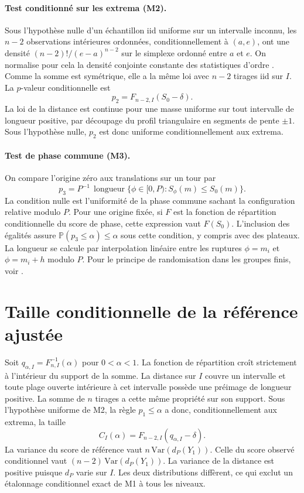\documentclass[11pt,a4paper]{article}
\newcommand{\Prb}{\mathbb P}
\begin{document}
\paragraph{Test conditionné sur les extrema (M2).}
Sous l'hypothèse nulle d'un échantillon iid uniforme sur un intervalle inconnu, les $n-2$ observations intérieures ordonnées, conditionnellement à $(a,e)$, ont une densité $(n-2)!/(e-a)^{n-2}$ sur le simplexe ordonné entre $a$ et $e$. On normalise pour cela la densité conjointe constante des statistiques d'ordre \cite{order}. Comme la somme est symétrique, elle a la même loi avec $n-2$ tirages iid sur $I$. La $p$-valeur conditionnelle est
\begin{equation}\label{eq:m2}
p_2=F_{n-2,I}(S_0-\delta).
\end{equation}
La loi de la distance est continue pour une masse uniforme sur tout intervalle de longueur positive, par découpage du profil triangulaire en segments de pente $\pm1$. Sous l'hypothèse nulle, $p_2$ est donc uniforme conditionnellement aux extrema.

\paragraph{Test de phase commune (M3).}
On compare l'origine zéro aux translations sur un tour par
\begin{equation}\label{eq:m3}
p_3=P^{-1}\,\operatorname{longueur}\{\phi\in[0,P):S_\phi(m)\leq S_0(m)\}.
\end{equation}
La condition nulle est l'uniformité de la phase commune sachant la configuration relative modulo $P$. Pour une origine fixée, si $F$ est la fonction de répartition conditionnelle du score de phase, cette expression vaut $F(S_0)$. L'inclusion des égalités assure $\Prb(p_3\leq\alpha)\leq\alpha$ sous cette condition, y compris avec des plateaux. La longueur se calcule par interpolation linéaire entre les ruptures $\phi=m_i$ et $\phi=m_i+h$ modulo $P$. Pour le principe de randomisation dans les groupes finis, voir \cite{hemerik}.

\section{Taille conditionnelle de la référence ajustée}

Soit $q_{\alpha,I}=F_{n,I}^{-1}(\alpha)$ pour $0<\alpha<1$. La fonction de répartition croît strictement à l'intérieur du support de la somme. La distance sur $I$ couvre un intervalle et toute plage ouverte intérieure à cet intervalle possède une préimage de longueur positive. La somme de $n$ tirages a cette même propriété sur son support. Sous l'hypothèse uniforme de M2, la règle $p_1\leq\alpha$ a donc, conditionnellement aux extrema, la taille
\begin{equation}\label{eq:cond}
C_I(\alpha)=F_{n-2,I}(q_{\alpha,I}-\delta).
\end{equation}
La variance du score de référence vaut $n\,\mathrm{Var}(d_P(Y_1))$. Celle du score observé conditionnel vaut $(n-2)\,\mathrm{Var}(d_P(Y_1))$. La variance de la distance est positive puisque $d_P$ varie sur $I$. Les deux distributions diffèrent, ce qui exclut un étalonnage conditionnel exact de M1 à tous les niveaux.
\end{document}
